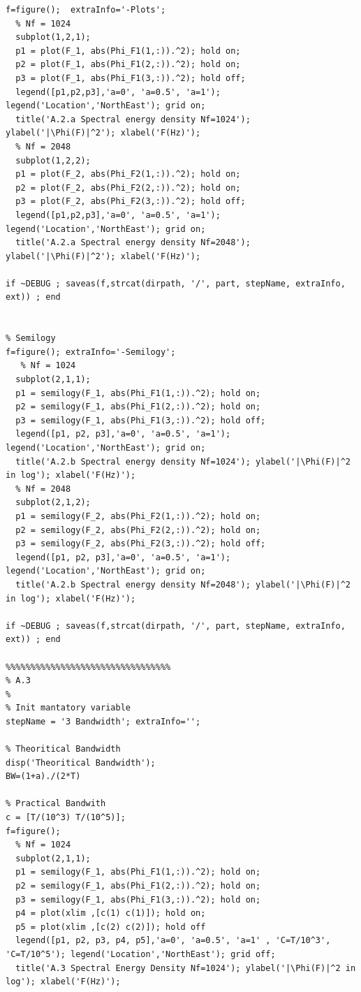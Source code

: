 \documentclass[11pt]{article}
\begin{document}
\begin{lstlisting}[caption = {\texttt{part\_a.m}}]
% Plot them 
f=figure();  extraInfo='-Plots';
  % Nf = 1024
  subplot(1,2,1); 
  p1 = plot(F_1, abs(Phi_F1(1,:)).^2); hold on;
  p2 = plot(F_1, abs(Phi_F1(2,:)).^2); hold on;
  p3 = plot(F_1, abs(Phi_F1(3,:)).^2); hold off;
  legend([p1,p2,p3],'a=0', 'a=0.5', 'a=1'); legend('Location','NorthEast'); grid on;
  title('A.2.a Spectral energy density Nf=1024'); ylabel('|\Phi(F)|^2'); xlabel('F(Hz)');
  % Nf = 2048
  subplot(1,2,2); 
  p1 = plot(F_2, abs(Phi_F2(1,:)).^2); hold on;
  p2 = plot(F_2, abs(Phi_F2(2,:)).^2); hold on;
  p3 = plot(F_2, abs(Phi_F2(3,:)).^2); hold off;
  legend([p1,p2,p3],'a=0', 'a=0.5', 'a=1'); legend('Location','NorthEast'); grid on;
  title('A.2.a Spectral energy density Nf=2048'); ylabel('|\Phi(F)|^2'); xlabel('F(Hz)');
  
if ~DEBUG ; saveas(f,strcat(dirpath, '/', part, stepName, extraInfo, ext)) ; end


% Semilogy 
f=figure(); extraInfo='-Semilogy';
   % Nf = 1024
  subplot(2,1,1); 
  p1 = semilogy(F_1, abs(Phi_F1(1,:)).^2); hold on;
  p2 = semilogy(F_1, abs(Phi_F1(2,:)).^2); hold on;
  p3 = semilogy(F_1, abs(Phi_F1(3,:)).^2); hold off;
  legend([p1, p2, p3],'a=0', 'a=0.5', 'a=1'); legend('Location','NorthEast'); grid on;
  title('A.2.b Spectral energy density Nf=1024'); ylabel('|\Phi(F)|^2 in log'); xlabel('F(Hz)');
  % Nf = 2048
  subplot(2,1,2); 
  p1 = semilogy(F_2, abs(Phi_F2(1,:)).^2); hold on;
  p2 = semilogy(F_2, abs(Phi_F2(2,:)).^2); hold on;
  p3 = semilogy(F_2, abs(Phi_F2(3,:)).^2); hold off;
  legend([p1, p2, p3],'a=0', 'a=0.5', 'a=1'); legend('Location','NorthEast'); grid on;
  title('A.2.b Spectral energy density Nf=2048'); ylabel('|\Phi(F)|^2 in log'); xlabel('F(Hz)');
  
if ~DEBUG ; saveas(f,strcat(dirpath, '/', part, stepName, extraInfo, ext)) ; end

%%%%%%%%%%%%%%%%%%%%%%%%%%%%%%%%%
% A.3
%
% Init mantatory variable 
stepName = '3 Bandwidth'; extraInfo='';

% Theoritical Bandwidth
disp('Theoritical Bandwidth');
BW=(1+a)./(2*T)

% Practical Bandwith 
c = [T/(10^3) T/(10^5)];
f=figure();
  % Nf = 1024
  subplot(2,1,1); 
  p1 = semilogy(F_1, abs(Phi_F1(1,:)).^2); hold on;
  p2 = semilogy(F_1, abs(Phi_F1(2,:)).^2); hold on;
  p3 = semilogy(F_1, abs(Phi_F1(3,:)).^2); hold on;
  p4 = plot(xlim ,[c(1) c(1)]); hold on;
  p5 = plot(xlim ,[c(2) c(2)]); hold off
  legend([p1, p2, p3, p4, p5],'a=0', 'a=0.5', 'a=1' , 'C=T/10^3', 'C=T/10^5'); legend('Location','NorthEast'); grid off;
  title('A.3 Spectral Energy Density Nf=1024'); ylabel('|\Phi(F)|^2 in log'); xlabel('F(Hz)');


\end{lstlisting}
\end{document}
